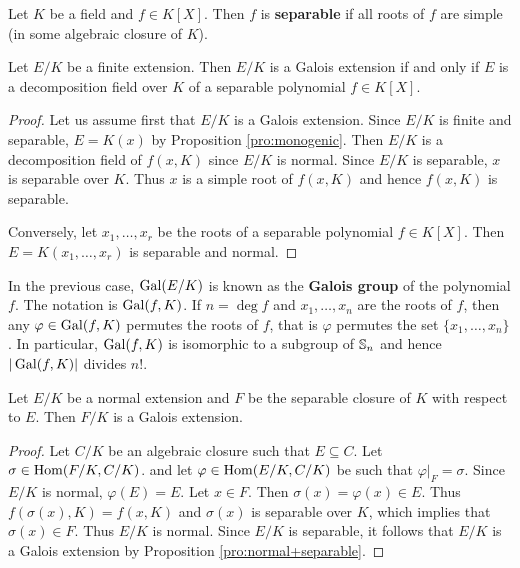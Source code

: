 \begin{definition}
Let $K$ be a field and $f\in K[X]$. Then $f$ is \textbf{separable}
if all roots of $f$ are simple (in some algebraic closure of $K$). 
\end{definition}

\begin{proposition}
    Let $E/K$ be a finite extension. Then $E/K$ is a Galois extension 
    if and only if $E$ is a decomposition field over $K$ 
    of a separable polynomial $f\in K[X]$. 
\end{proposition}

\begin{proof}
    Let us assume first that $E/K$ is a Galois extension. Since
    $E/K$ is finite and separable, $E=K(x)$ by Proposition \ref{pro:monogenic}. 
    Then $E/K$ is a decomposition field of $f(x,K)$ since
    $E/K$ is normal. Since $E/K$ is separable, $x$ is separable over $K$. Thus $x$ is 
    a simple root of $f(x,K)$ and hence $f(x,K)$ is separable. 
    
    Conversely, let $x_1,\dots,x_r$ be the roots of a separable polynomial $f\in K[X]$.
    Then $E=K(x_1,\dots,x_r)$ is separable and normal.  
\end{proof}

In the previous case, $\operatorname{Gal}(E/K)$ is known as the \textbf{Galois group}
of the polynomial $f$. The notation is $\operatorname{Gal}(f,K)$. If $n=\deg f$ and
$x_1,\dots,x_n$ are the roots of $f$, then any 
$\varphi\in\operatorname{Gal}(f,K)$ permutes the roots of $f$, that is
$\varphi$ permutes the 
set $\{x_1,\dots,x_n\}$. In particular, $\operatorname{Gal}(f,K)$ is isomorphic to a subgroup of
$\mathbb{S}_n$ and hence $|\operatorname{Gal}(f,K)|$ divides $n!$. 

\begin{proposition}
    Let $E/K$ be a normal extension and $F$ be the separable
    closure of $K$ with respect to $E$. 
    Then $F/K$ is a Galois extension.
\end{proposition}

\begin{proof} 
    Let $C/K$ be an algebraic closure such that $E\subseteq C$. Let $\sigma\in\operatorname{Hom}(F/K,C/K)$. 
    and let $\varphi\in\operatorname{Hom}(E/K,C/K)$ be such that $\varphi|_F=\sigma$. Since $E/K$ is normal, 
    $\varphi(E)=E$. Let $x\in F$. Then $\sigma(x)=\varphi(x)\in E$. Thus
    $f(\sigma(x),K)=f(x,K)$ and $\sigma(x)$ is separable over $K$, which 
    implies that $\sigma(x)\in F$. Thus $E/K$ is normal. Since $E/K$ is separable, it follows
    that $E/K$ is a Galois extension by Proposition \ref{pro:normal+separable}.
\end{proof}

